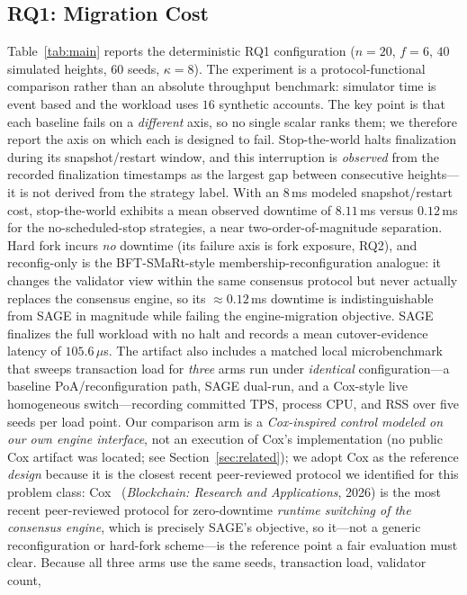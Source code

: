 \documentclass[journal]{IEEEtran}
\theoremstyle{definition}
\theoremstyle{remark}
\begin{document}
\subsection{RQ1: Migration Cost}
Table~\ref{tab:main} reports the deterministic RQ1
configuration ($n=20$, $f=6$, $40$ simulated heights, $60$ seeds, $\kappa=8$). The experiment is
a protocol-functional comparison rather than an absolute throughput benchmark: simulator time is
event based and the workload uses $16$ synthetic accounts. The key point is that each baseline
fails on a \emph{different} axis, so no single scalar ranks them; we therefore report the axis on
which each is designed to fail. Stop-the-world halts finalization during its snapshot/restart
window, and this interruption is \emph{observed} from the recorded finalization timestamps as the
largest gap between consecutive heights---it is not derived from the strategy label. With an
$8\,$ms modeled snapshot/restart cost, stop-the-world exhibits a mean observed downtime of
$8.11\,$ms versus $0.12\,$ms for the no-scheduled-stop strategies, a near two-order-of-magnitude
separation. Hard fork incurs \emph{no} downtime (its failure axis is fork exposure, RQ2), and
reconfig-only is the BFT-SMaRt-style membership-reconfiguration analogue: it changes the
validator view within the same consensus protocol but never actually replaces the consensus
engine, so its $\approx 0.12\,$ms downtime is indistinguishable from SAGE in magnitude while
failing the engine-migration objective. SAGE
finalizes the full workload with no halt and records a mean cutover-evidence latency of
$105.6\,\mu$s. The artifact also includes a matched local microbenchmark
that sweeps transaction load for \emph{three} arms run under
\emph{identical} configuration---a baseline PoA/reconfiguration path, SAGE dual-run, and a
Cox-style live homogeneous switch---recording committed TPS, process CPU, and RSS over five seeds per
load point. Our comparison arm is a \emph{Cox-inspired control modeled on our own engine interface},
not an execution of Cox's implementation (no public Cox artifact was located; see
Section~\ref{sec:related}); we adopt Cox as the reference \emph{design} because it is the closest recent
peer-reviewed protocol we identified for this problem class: Cox~\cite{cox} (\emph{Blockchain: Research
and Applications}, 2026) is the most recent peer-reviewed protocol for zero-downtime \emph{runtime
switching of the consensus engine}, which is precisely SAGE's objective, so it---not a generic
reconfiguration or hard-fork scheme---is the reference point a fair evaluation must clear. Because all three arms use the same seeds, transaction load, validator count,
\end{document}

